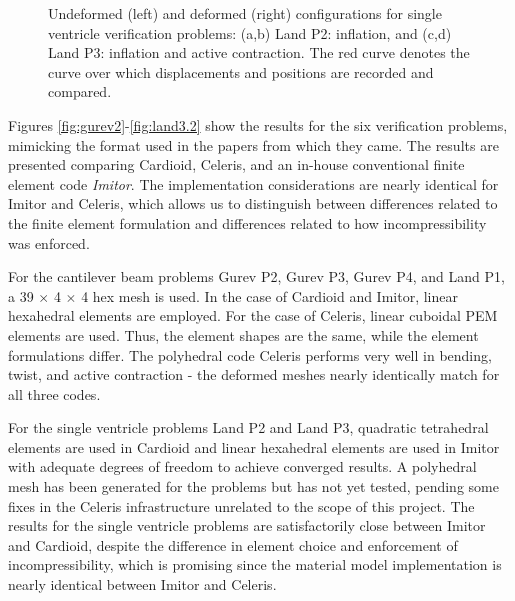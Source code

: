 \begin{figure}[ht]
{\label{fig:ventricles3}}		
%
\caption{Undeformed (left) and deformed (right) configurations for single ventricle verification problems: (a,b) Land P2: inflation, and (c,d) Land P3: inflation and active contraction. The red curve denotes the curve over which displacements and positions are recorded and compared.}
\label{fig:ventricles}
\end{figure}

Figures \ref*{fig:gurev2}-\ref*{fig:land3.2} show the results for the six verification problems, mimicking the format used in the papers from which they came. The results are presented comparing Cardioid, Celeris, and an in-house conventional finite element code \textit{Imitor}. The implementation considerations are nearly identical for Imitor and Celeris, which allows us to distinguish between differences related to the finite element formulation and differences related to how incompressibility was enforced.

For the cantilever beam problems Gurev P2, Gurev P3, Gurev P4, and Land P1, a 39 $\times$ 4 $\times$ 4 hex mesh is used. In the case of Cardioid and Imitor, linear hexahedral elements are employed. For the case of Celeris, linear cuboidal PEM elements are used. Thus, the element shapes are the same, while the element formulations differ. The polyhedral code Celeris performs very well in bending, twist, and active contraction - the deformed meshes nearly identically match for all three codes.

For the single ventricle problems Land P2 and Land P3, quadratic tetrahedral elements are used in Cardioid and linear hexahedral elements are used in Imitor with adequate degrees of freedom to achieve converged results. A polyhedral mesh has been generated for the problems but has not yet tested, pending some fixes in the Celeris infrastructure unrelated to the scope of this project. The results for the single ventricle problems are satisfactorily close between Imitor and Cardioid, despite the difference in element choice and enforcement of incompressibility, which is promising since the material model implementation is nearly identical between Imitor and Celeris.

